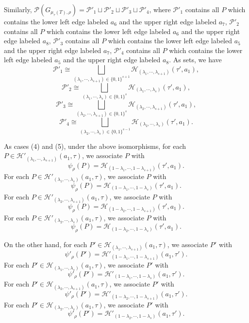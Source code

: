 \documentclass[10pt]{amsart}
\theoremstyle{theorems}
\begin{document}
Similarly, $\mathcal P(G_{\mu_{\tau}(T),\rho})=\mathcal P'_1\sqcup \mathcal P'_2\sqcup \mathcal P'_3\sqcup \mathcal P'_4$, where $\mathcal P'_1$ contains all $P$ which contains the lower left edge labeled $a_6$ and the upper right edge labeled $a_7$, $\mathcal P'_2$ contains all $P$ which contains the lower left edge labeled $a_6$ and the upper right edge labeled $a_8$, $\mathcal P'_3$ contains all $P$ which contains the lower left edge labeled $a_5$ and the upper right edge labeled $a_7$, $\mathcal P'_4$ contains all $P$ which contains the lower left edge labeled $a_5$ and the upper right edge labeled $a_8$. As sets, we have $$\mathcal P'_1\cong\textstyle\bigsqcup_{(\lambda_1,\cdots,\lambda_{s+1})\in \{0,1\}^{s+1}}\mathcal H_{(\lambda_1,\cdots,\lambda_{s+1})}(\tau',a_1),$$ $$\mathcal P'_2\cong\textstyle\bigsqcup_{(\lambda_1,\cdots,\lambda_s)\in \{0,1\}^{s}}\mathcal H_{(\lambda_1,\cdots,\lambda_s)}(\tau',a_1),$$ $$\mathcal P'_3\cong\textstyle\bigsqcup_{(\lambda_2,\cdots,\lambda_{s+1})\in \{0,1\}^{s}}\mathcal H_{(\lambda_2,\cdots,\lambda_{s+1})}(\tau',a_1),$$ $$\mathcal P'_4\cong\textstyle\bigsqcup_{(\lambda_2,\cdots,\lambda_{s})\in \{0,1\}^{s-1}}\mathcal H_{(\lambda_2,\cdots,\lambda_{s})}(\tau',a_1).$$

\medskip

As cases (4) and (5), under the above isomorphisms, for each $P\in \mathcal H'_{(\lambda_1,\cdots,\lambda_{s+1})}(a_1,\tau)$, we associate $P$ with
$$\psi_{\rho}(P)=\mathcal H_{(1-\lambda_1,\cdots,1-\lambda_{s+1})}(\tau',a_1).$$ For each $P\in \mathcal H'_{(\lambda_1,\cdots,\lambda_{s})}(a_1,\tau)$, we associate $P$ with
$$\psi_{\rho}(P)=\mathcal H_{(1-\lambda_1,\cdots,1-\lambda_{s})}(\tau',a_1).$$ For each $P\in \mathcal H'_{(\lambda_2,\cdots,\lambda_{s+1})}(a_1,\tau)$, we associate $P$ with
$$\psi_{\rho}(P)=\mathcal H_{(1-\lambda_2,\cdots,1-\lambda_{s+1})}(\tau',a_1).$$ For each $P\in \mathcal H'_{(\lambda_2,\cdots,\lambda_{s})}(a_1,\tau)$, we associate $P$ with
$$\psi_{\rho}(P)=\mathcal H_{(1-\lambda_2,\cdots,1-\lambda_{s})}(\tau',a_1).$$

On the other hand, for each $P'\in \mathcal H_{(\lambda_1,\cdots,\lambda_{s+1})}(a_1,\tau)$, we associate $P'$ with $$\psi'_{\rho}(P')=\mathcal H'_{(1-\lambda_1,\cdots,1-\lambda_{s+1})}(a_1,\tau').$$ For each $P'\in \mathcal H_{(\lambda_1,\cdots,\lambda_{s})}(a_1,\tau)$, we associate $P'$ with $$\psi'_{\rho}(P')=\mathcal H'_{(1-\lambda_1,\cdots,1-\lambda_{s})}(a_1,\tau').$$ For each $P'\in \mathcal H_{(\lambda_2,\cdots,\lambda_{s+1})}(a_1,\tau)$, we associate $P'$ with $$\psi'_{\rho}(P')=\mathcal H'_{(1-\lambda_2,\cdots,1-\lambda_{s+1})}(a_1,\tau').$$ For each $P'\in \mathcal H_{(\lambda_2,\cdots,\lambda_{s})}(a_1,\tau)$, we associate $P'$ with $$\psi'_{\rho}(P')=\mathcal H'_{(1-\lambda_2,\cdots,1-\lambda_{s})}(a_1,\tau').$$
\end{document}
